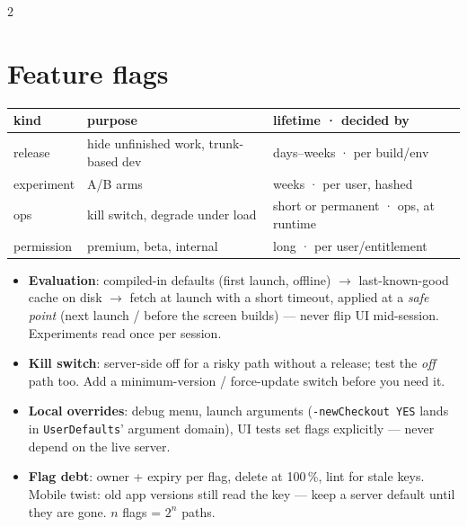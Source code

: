 \documentclass[8pt]{extarticle}
\newcommand\ct[1]{\texttt{#1}}
\begin{document}
\begin{multicols}{2}
\small{}\raggedright

\section{Feature flags}
{\footnotesize\setlength{\tabcolsep}{3pt}
\begin{tabular}{@{}>{\raggedright\arraybackslash}p{13mm}>{\raggedright\arraybackslash}p{30mm}>{\raggedright\arraybackslash}p{32mm}@{}}
\toprule
\textbf{kind} & \textbf{purpose} & \textbf{lifetime · decided by}\\ \midrule
release & hide unfinished work, trunk-based dev & days–weeks · per build/env\\
experiment & A/B arms & weeks · per user, hashed\\
ops & kill switch, degrade under load & short or permanent · ops, at runtime\\
permission & premium, beta, internal & long · per user/entitlement\\
\bottomrule
\end{tabular}}
\begin{itemize}
  \item \textbf{Evaluation}: compiled-in defaults (first launch, offline) $\to$
        last-known-good cache on disk $\to$ fetch at launch with a short
        timeout, applied at a \emph{safe point} (next launch / before the screen
        builds) — never flip UI mid-session. Experiments read once per session.
  \item \textbf{Kill switch}: server-side off for a risky path without a
        release; test the \emph{off} path too. Add a minimum-version /
        force-update switch before you need it.
  \item \textbf{Local overrides}: debug menu, launch arguments (\ct{-newCheckout
        YES} lands in \ct{UserDefaults}' argument domain), UI tests set flags
        explicitly — never depend on the live server.
  \item \textbf{Flag debt}: owner + expiry per flag, delete at 100\,\%, lint for
        stale keys. Mobile twist: old app versions still read the key — keep a
        server default until they are gone. $n$ flags = $2^n$ paths.
\end{itemize}


\end{multicols}
\end{document}
